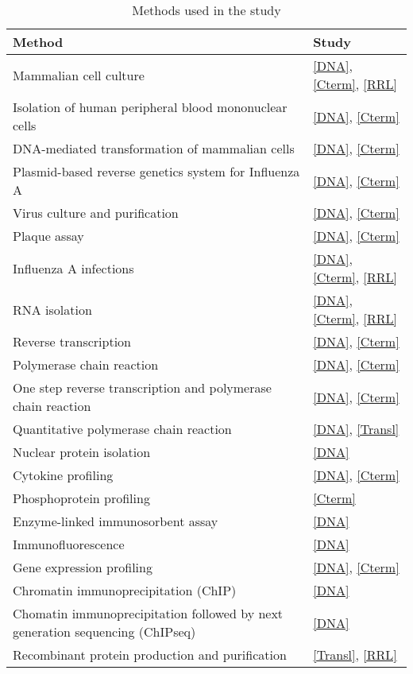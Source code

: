 	\begin{longtabu} to \linewidth {X[8,l] X[2,c]}		
		\caption{Methods used in the study} \label{tab:methods}\\
		
		\hline \textbf{Method} & \textbf{Study} \\ 
		\endhead
		
		\hline Mammalian cell culture & \ref*{DNA}, \ref*{Cterm}, \ref*{RRL} \\
		\hline Isolation of human peripheral blood mononuclear cells & \ref*{DNA}, \ref*{Cterm} \\
		\hline DNA-mediated transformation of mammalian cells & \ref*{DNA}, \ref*{Cterm}\\
		\hline Plasmid-based reverse genetics system for Influenza A & \ref*{DNA}, \ref*{Cterm} \\
		\hline Virus culture and purification & \ref*{DNA}, \ref*{Cterm} \\ 
		\hline Plaque assay & \ref*{DNA}, \ref*{Cterm} \\
		\hline Influenza A infections & \ref*{DNA}, \ref*{Cterm}, \ref*{RRL} \\ 
		\hline RNA isolation & \ref*{DNA}, \ref*{Cterm}, \ref*{RRL} \\
		\hline Reverse transcription & \ref*{DNA}, \ref*{Cterm} \\
		\hline Polymerase chain reaction & \ref*{DNA}, \ref*{Cterm} \\
		\hline One step reverse transcription and polymerase chain reaction & \ref*{DNA}, \ref*{Cterm} \\
		\hline Quantitative polymerase chain reaction & \ref*{DNA}, \ref*{Transl} \\
		\hline Nuclear protein isolation & \ref*{DNA} \\
		\hline Cytokine profiling & \ref*{DNA}, \ref*{Cterm} \\
		\hline Phosphoprotein profiling & \ref*{Cterm} \\
		\hline Enzyme-linked immunosorbent assay & \ref*{DNA} \\
		\hline Immunofluorescence & \ref*{DNA} \\ 
		\hline Gene expression profiling & \ref*{DNA}, \ref*{Cterm} \\
		\hline Chromatin immunoprecipitation (ChIP)& \ref*{DNA}\\
		\hline Chomatin immunoprecipitation followed by next generation sequencing (ChIPseq) & \ref*{DNA}\\
		\hline Recombinant protein production and purification & \ref*{Transl}, \ref*{RRL} \\

\end{longtabu}

